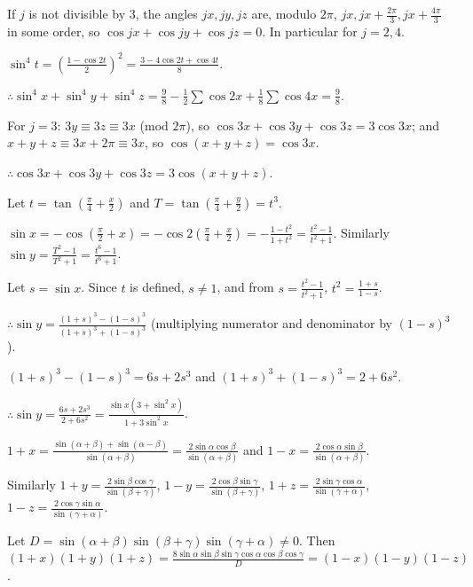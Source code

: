   If $j$ is not divisible by $3$, the angles $jx, jy, jz$ are, modulo $2\pi$, $jx, jx + \frac{2\pi}{3}, jx + \frac{4\pi}{3}$ in some
  order, so $\cos jx + \cos jy + \cos jz = 0$. In particular for $j = 2, 4$.

  $\sin^4t = \left(\frac{1 - \cos2t}{2}\right)^2 = \frac{3 - 4\cos2t + \cos4t}{8}$.

  $\therefore \sin^4x + \sin^4y + \sin^4z = \frac{9}{8} - \frac{1}{2}\sum\cos2x + \frac{1}{8}\sum\cos4x
  = \frac{9}{8}$.

  For $j = 3$: $3y\equiv 3z\equiv 3x$ (mod $2\pi$), so $\cos3x + \cos3y + \cos3z = 3\cos3x$; and $x + y + z\equiv 3x
  + 2\pi\equiv 3x$, so $\cos(x + y + z) = \cos3x$.

  $\therefore \cos3x + \cos3y + \cos3z = 3\cos(x + y + z)$.
\item Let $t = \tan\left(\frac{\pi}{4} + \frac{x}{2}\right)$ and $T = \tan\left(\frac{\pi}{4} + \frac{y}{2}\right) =
  t^3$.

  $\sin x = -\cos\left(\frac{\pi}{2} + x\right) = -\cos2\left(\frac{\pi}{4} + \frac{x}{2}\right) = -\frac{1 - t^2}{1 +
    t^2} = \frac{t^2 - 1}{t^2 + 1}$. Similarly $\sin y = \frac{T^2 - 1}{T^2 + 1} = \frac{t^6 - 1}{t^6 + 1}$.

  Let $s = \sin x$. Since $t$ is defined, $s\neq 1$, and from $s = \frac{t^2 - 1}{t^2 + 1}$, $t^2 = \frac{1 + s}{1 -
    s}$.

  $\therefore \sin y = \frac{(1 + s)^3 - (1 - s)^3}{(1 + s)^3 + (1 - s)^3}$ (multiplying numerator and denominator by
  $(1 - s)^3$).

  $(1 + s)^3 - (1 - s)^3 = 6s + 2s^3$ and $(1 + s)^3 + (1 - s)^3 = 2 + 6s^2$.

  $\therefore \sin y = \frac{6s + 2s^3}{2 + 6s^2} = \frac{\sin x\left(3 + \sin^2x\right)}{1 + 3\sin^2x}$.
\item $1 + x = \frac{\sin(\alpha + \beta) + \sin(\alpha - \beta)}{\sin(\alpha + \beta)} = \frac{2\sin\alpha\cos\beta}{\sin(\alpha
    + \beta)}$ and $1 - x = \frac{2\cos\alpha\sin\beta}{\sin(\alpha + \beta)}$.

  Similarly $1 + y = \frac{2\sin\beta\cos\gamma}{\sin(\beta + \gamma)}$, $1 - y = \frac{2\cos\beta\sin\gamma}{\sin(\beta +
    \gamma)}$, $1 + z = \frac{2\sin\gamma\cos\alpha}{\sin(\gamma + \alpha)}$, $1 - z = \frac{2\cos\gamma\sin\alpha}{\sin(\gamma +
    \alpha)}$.

  Let $D = \sin(\alpha + \beta)\sin(\beta + \gamma)\sin(\gamma + \alpha)\neq 0$. Then
  $(1 + x)(1 + y)(1 + z) = \frac{8\sin\alpha\sin\beta\sin\gamma\cos\alpha\cos\beta\cos\gamma}{D} = (1 - x)(1 - y)(1 - z)$.

